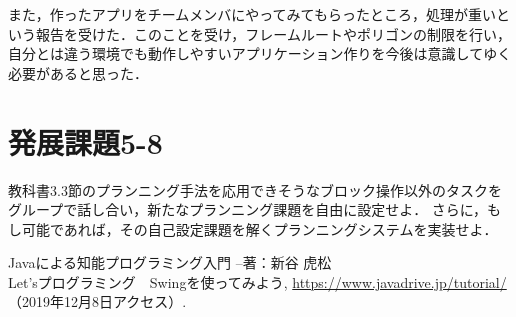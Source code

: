 \documentclass[uplatex,12pt]{jsarticle}
\begin{document}
また，作ったアプリをチームメンバにやってみてもらったところ，処理が重いという報告を受けた．このことを受け，フレームルートやポリゴンの制限を行い，自分とは違う環境でも動作しやすいアプリケーション作りを今後は意識してゆく必要があると思った．



\section{発展課題5-8}
\begin{screen}
    教科書3.3節のプランニング手法を応用できそうなブロック操作以外のタスクをグループで話し合い，新たなプランニング課題を自由に設定せよ．
    さらに，もし可能であれば，その自己設定課題を解くプランニングシステムを実装せよ．
\end{screen}


\begin{thebibliography}{99}
 Javaによる知能プログラミング入門 --著：新谷 虎松 \\
 Let'sプログラミング　Swingを使ってみよう, \url{https://www.javadrive.jp/tutorial/} （2019年12月8日アクセス）.
\end{thebibliography}
\end{document}
